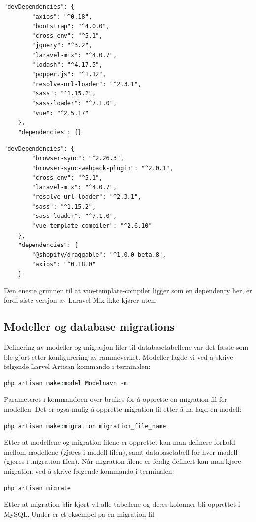 \begin{lstlisting}[caption={Orginal package.json}]
    "devDependencies": {
        "axios": "^0.18",
        "bootstrap": "^4.0.0",
        "cross-env": "^5.1",
        "jquery": "^3.2",
        "laravel-mix": "^4.0.7",
        "lodash": "^4.17.5",
        "popper.js": "^1.12",
        "resolve-url-loader": "^2.3.1",
        "sass": "^1.15.2",
        "sass-loader": "^7.1.0",
        "vue": "^2.5.17"
    },
    "dependencies": {}
\end{lstlisting}

\begin{lstlisting}[caption={Siste package.json}]
    "devDependencies": {
        "browser-sync": "^2.26.3",
        "browser-sync-webpack-plugin": "^2.0.1",
        "cross-env": "^5.1",
        "laravel-mix": "^4.0.7",
        "resolve-url-loader": "^2.3.1",
        "sass": "^1.15.2",
        "sass-loader": "^7.1.0",
        "vue-template-compiler": "^2.6.10"
    },
    "dependencies": {
        "@shopify/draggable": "^1.0.0-beta.8",
        "axios": "^0.18.0"
    }
\end{lstlisting}
Den eneste grunnen til at vue-template-compiler ligger som en dependency her, er fordi siste versjon av Laravel Mix ikke kjører uten.

\subsection{Modeller og database migrations}
Definering av modeller og migrasjon filer til databasetabellene var det første som ble gjort etter konfigurering av rammeverket.
Modeller lagde vi ved å skrive følgende Larvel Artisan kommando i terminalen:
\begin{lstlisting}[caption={Laravel Artisan kommando for oppretting av modell og migration},language=php]
    php artisan make:model Modelnavn -m
\end{lstlisting}
Parameteret  i kommandoen over brukes for å opprette en migration-fil for modellen. Det er også mulig å opprette migration-fil etter å ha lagd en modell:
\begin{lstlisting}[caption={Laravel Artisan kommando for oppretting av migration fil},language=php]
    php artisan make:migration migration_file_name
\end{lstlisting}
Etter at modellene og migration filene er opprettet kan man definere forhold mellom modellene (gjøres i modell filen), samt databasetabell for hver modell (gjøres i migration filen).
Når migration filene er ferdig definert kan man kjøre migration ved å skrive følgende kommando i terminalen:
\begin{lstlisting}[caption={Laravel Artisan kommando for å kjøre migration},language=php]
    php artisan migrate
\end{lstlisting}
Etter at migration blir kjørt vil alle tabellene og deres kolonner bli opprettet i MySQL.
Under er et eksempel på en migration fil


